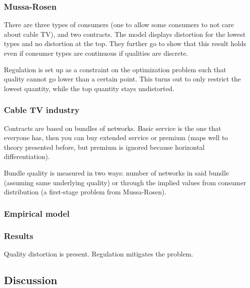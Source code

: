 \subsubsection{Mussa-Rosen}

There are three types of consumers (one to allow some consumers to not care about cable TV), and two contracts. The model displays distortion for the lowest types and no distortion at the top. They further go to show that this result holds even if consumer types are continuous if qualities are discrete.

Regulation is set up as a constraint on the optimization problem such that quality cannot go lower than a certain point. This turns out to only restrict the lowest quantity, while the top quantity stays undistorted.

\subsubsection{Cable TV industry}

Contracts are based on bundles of networks. Basic service is the one that everyone has, then you can buy extended service or premium (maps well to theory presented before, but premium is ignored because horizontal differentiation).

Bundle quality is measured in two ways: number of networks in said bundle (assuming same underlying quality) or through the implied values from consumer distribution (a first-stage problem from Mussa-Rosen).

\subsubsection{Empirical model}



\subsubsection{Results}

Quality distortion is present. Regulation mitigates the problem.

\subsection{Discussion}

